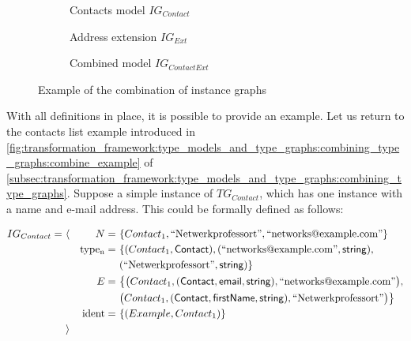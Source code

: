 \begin{figure}
    \centering
    \begin{subfigure}{0.3\textwidth}
        \centering
        
        \caption{Contacts model $IG_{Contact}$}
        \label{fig:transformation_framework:instance_models_and_instance_graphs:combining_instance_graphs:combine_example_ig1}
    \end{subfigure}
    \begin{subfigure}{0.3\textwidth}
        \centering
        
        \caption{Address extension $IG_{Ext}$}
        \label{fig:transformation_framework:instance_models_and_instance_graphs:combining_instance_graphs:combine_example_ig2}
    \end{subfigure}
    \begin{subfigure}{0.35\textwidth}
        \centering
        
        \caption{Combined model $IG_{ContactExt}$}
        \label{fig:transformation_framework:instance_models_and_instance_graphs:combining_instance_graphs:combine_example_ig12}
    \end{subfigure}
    \caption{Example of the combination of instance graphs}
    \label{fig:transformation_framework:instance_models_and_instance_graphs:combining_instance_graphs:combine_example}
\end{figure}

With all definitions in place, it is possible to provide an example. Let us return to the contacts list example introduced in \cref{fig:transformation_framework:type_models_and_type_graphs:combining_type_graphs:combine_example} of \cref{subsec:transformation_framework:type_models_and_type_graphs:combining_type_graphs}. Suppose a simple instance of $TG_{Contact}$, which has one instance with a name and e-mail address. This could be formally defined as follows:

\begin{align*}
IG_{Contact} =\ &\langle&
N =\ &\{ Contact_1, \text{``Netwerkprofessort''}, \text{``networks@example.com''} \} \\&&
\mathrm{type_{n}} =\ &\{
( Contact_1, \mathsf{Contact} ),
( \text{``networks@example.com''}, \mathsf{string} ),\\&&&
( \text{``Netwerkprofessort''}, \mathsf{string} )
\} \\&&
E =\ &\big\{
\big( Contact_1, ( \mathsf{Contact}, \mathsf{email}, \mathsf{string} ), \text{``networks@example.com''} \big),\\&&&
\big( Contact_1, ( \mathsf{Contact}, \mathsf{firstName}, \mathsf{string} ), \text{``Netwerkprofessort''} \big)
\big\} \\&&
\mathrm{ident} =\ &\{
( Example, Contact_1 )
\}
\\&\rangle
\end{align*}

